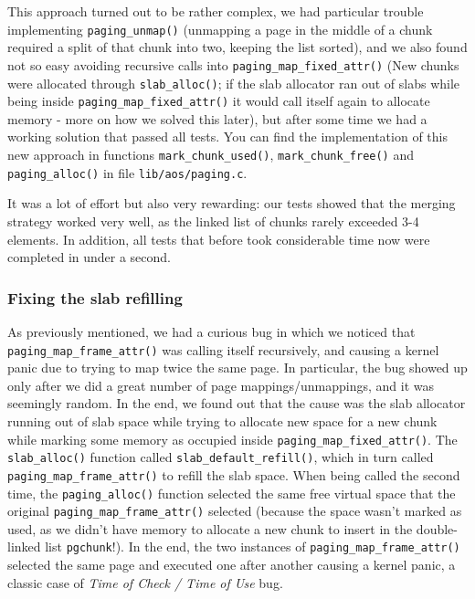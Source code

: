 \documentclass[a4paper,twoside,openright]{report}
\renewcommand{\t}[1]{%
	{\texttt{#1}}}
\begin{document}
This approach turned out to be rather complex, we had particular trouble
implementing \t{paging\_unmap()} (unmapping a page in the middle of a chunk
required a split of that chunk into two, keeping the list sorted), and we also
found not so easy avoiding recursive calls into \t{paging\_map\_fixed\_attr()}
(New chunks were allocated through \t{slab\_alloc()}; if the slab allocator ran
out of slabs while being inside \t{paging\_map\_fixed\_attr()} it would call
itself again to allocate memory - more on how we solved this later), but after
some time we had a working solution that passed all tests. You can find the 
implementation of this new approach in functions \t{mark\_chunk\_used()}, 
\t{mark\_chunk\_free()} and \t{paging\_alloc()} in file \t{lib/aos/paging.c}.

It was a lot of effort but also very rewarding: our tests showed that the merging
strategy worked very well, as the linked list of chunks rarely exceeded 3-4 elements.
In addition, all tests that before took considerable time now were completed in under
a second.


\subsubsection{Fixing the slab refilling}

As previously mentioned, we had a curious bug in which we noticed that
\t{paging\_map\_frame\_attr()} was calling itself recursively, and causing a
kernel panic due to trying to map twice the same page.  In particular, the bug
showed up only after we did a great number of page mappings/unmappings, and it
was seemingly random.  In the end, we found out that the cause was the slab
allocator running out of slab space while trying to allocate new space for a
new chunk while marking some memory as occupied inside
\t{paging\_map\_fixed\_attr()}.  The \t{slab\_alloc()} function called
\t{slab\_default\_refill()}, which in turn called
\t{paging\_map\_frame\_attr()} to refill the slab space. When being called the
second time, the \t{paging\_alloc()} function selected the same free virtual
space that the original \t{paging\_map\_frame\_attr()} selected (because the
space wasn't marked as used, as we didn't have memory to allocate a new chunk
to insert in the double-linked list \t{pgchunk}!). In the end, the two
instances of \t{paging\_map\_frame\_attr()} selected the same page and executed
one after another causing a kernel panic, a classic case of \emph{Time of Check / Time of Use} bug.
\end{document}

